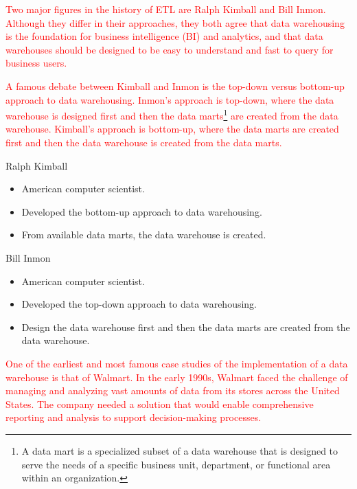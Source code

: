 \textcolor{red}{
Two major figures in the history of ETL are Ralph Kimball and Bill Inmon.  Although they
differ in their approaches, they both agree that data warehousing is the foundation for
business intelligence (BI) and analytics, and that data warehouses should be designed to
be easy to understand and fast to query for business users.
}

\textcolor{red}{
A famous debate between Kimball and Inmon is the top-down versus bottom-up approach to
data warehousing.  Inmon's approach is top-down, where the data warehouse is designed
first and then the data marts\footnote{A data mart is a specialized subset of a data warehouse that is designed to serve the needs of a specific business unit, department, or functional area within an organization.} are created from the data warehouse.  Kimball's approach is
bottom-up, where the data marts are created first and then the data warehouse is created
from the data marts.
}

\begin{slidebox}{Ralph Kimball}{}
  \begin{itemize}
    \item American computer scientist.
    \item Developed the bottom-up approach to data warehousing.
    \item From available data marts, the data warehouse is created.
  \end{itemize}
\end{slidebox}

\begin{slidebox}{Bill Inmon}{}
  \begin{itemize}
    \item American computer scientist.
    \item Developed the top-down approach to data warehousing.
    \item Design the data warehouse first and then the data marts are created from the data warehouse.
  \end{itemize}
\end{slidebox}

\textcolor{red}{
One of the earliest and most famous case studies of the implementation of a data warehouse
is that of Walmart. In the early 1990s, Walmart faced the challenge of managing and
analyzing vast amounts of data from its stores across the United States. The company
needed a solution that would enable comprehensive reporting and analysis to support
decision-making processes.
}

